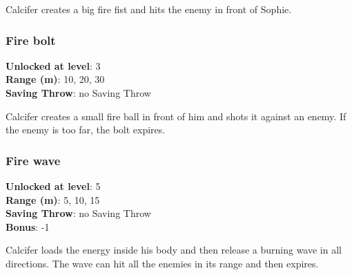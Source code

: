 Calcifer creates a big fire fist and hits the enemy in front of Sophie.

\subsubsection{Fire bolt}
\textbf{Unlocked at level}: 3 \\
\textbf{Range (m)}: 10, 20, 30 \\
\textbf{Saving Throw}: no Saving Throw

Calcifer creates a small fire ball in front of him and shots it against an enemy. If the enemy is too far, the bolt expires.

\subsubsection{Fire wave}
\textbf{Unlocked at level}: 5 \\
\textbf{Range (m)}: 5, 10, 15 \\
\textbf{Saving Throw}: no Saving Throw \\
\textbf{Bonus}: -1

Calcifer loads the energy inside his body and then release a burning wave in all directions. The wave can hit all the enemies in its range and then expires.


